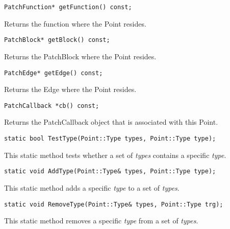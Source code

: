 \begin{verbatim}
PatchFunction* getFunction() const;

\end{verbatim}



Returns the function where the Point resides.


\begin{verbatim}
PatchBlock* getBlock() const;

\end{verbatim}



Returns the PatchBlock where the Point resides.


\begin{verbatim}
PatchEdge* getEdge() const;

\end{verbatim}



Returns the Edge where the Point resides.


\begin{verbatim}
PatchCallback *cb() const;

\end{verbatim}



Returns the PatchCallback object that is associated with this Point.


\begin{verbatim}
static bool TestType(Point::Type types, Point::Type type);

\end{verbatim}



This static method tests whether a set of \emph{types} contains a specific \emph{type}.


\begin{verbatim}
static void AddType(Point::Type& types, Point::Type type);

\end{verbatim}



This static method adds a specific \emph{type} to a set of \emph{types}.


\begin{verbatim}
static void RemoveType(Point::Type& types, Point::Type trg);

\end{verbatim}



This static method removes a specific \emph{type} from a set of \emph{types}.


